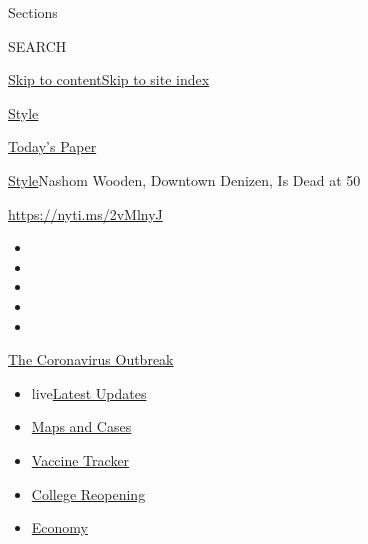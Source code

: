 Sections

SEARCH

\protect\hyperlink{site-content}{Skip to
content}\protect\hyperlink{site-index}{Skip to site index}

\href{https://www.nytimes.com/section/style}{Style}

\href{https://myaccount.nytimes.com/auth/login?response_type=cookie\&client_id=vi}{}

\href{https://www.nytimes.com/section/todayspaper}{Today's Paper}

\href{/section/style}{Style}\textbar{}Nashom Wooden, Downtown Denizen,
Is Dead at 50

\url{https://nyti.ms/2vMlnyJ}

\begin{itemize}
\item
\item
\item
\item
\item
\end{itemize}

\href{https://www.nytimes.com/news-event/coronavirus?action=click\&pgtype=Article\&state=default\&region=TOP_BANNER\&context=storylines_menu}{The
Coronavirus Outbreak}

\begin{itemize}
\tightlist
\item
  live\href{https://www.nytimes.com/2020/08/03/world/coronavirus-covid-19.html?action=click\&pgtype=Article\&state=default\&region=TOP_BANNER\&context=storylines_menu}{Latest
  Updates}
\item
  \href{https://www.nytimes.com/interactive/2020/us/coronavirus-us-cases.html?action=click\&pgtype=Article\&state=default\&region=TOP_BANNER\&context=storylines_menu}{Maps
  and Cases}
\item
  \href{https://www.nytimes.com/interactive/2020/science/coronavirus-vaccine-tracker.html?action=click\&pgtype=Article\&state=default\&region=TOP_BANNER\&context=storylines_menu}{Vaccine
  Tracker}
\item
  \href{https://www.nytimes.com/2020/08/02/us/covid-college-reopening.html?action=click\&pgtype=Article\&state=default\&region=TOP_BANNER\&context=storylines_menu}{College
  Reopening}
\item
  \href{https://www.nytimes.com/live/2020/08/03/business/stock-market-today-coronavirus?action=click\&pgtype=Article\&state=default\&region=TOP_BANNER\&context=storylines_menu}{Economy}
\end{itemize}

